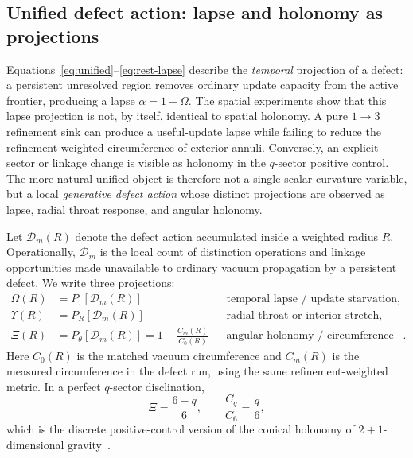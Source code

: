 
\subsection{Unified defect action: lapse and holonomy as projections}\label{sec:unified-defect-action}

Equations~\eqref{eq:unified}--\eqref{eq:rest-lapse} describe the
\emph{temporal} projection of a defect: a persistent unresolved region removes
ordinary update capacity from the active frontier, producing a lapse
$\alpha=1-\Omega$.  The spatial experiments show that this lapse projection is
not, by itself, identical to spatial holonomy.  A pure $1\to3$ refinement sink can
produce a useful-update lapse while failing to reduce the refinement-weighted
circumference of exterior annuli.  Conversely, an explicit sector or linkage
change is visible as holonomy in the $q$-sector positive control.  The more
natural unified object is therefore not a single scalar curvature variable, but
a local \emph{generative defect action} whose distinct projections are observed
as lapse, radial throat response, and angular holonomy.

Let $\mathcal{D}_m(R)$ denote the defect action accumulated inside a weighted
radius $R$.  Operationally, $\mathcal{D}_m$ is the local count of distinction
operations and linkage opportunities made unavailable to ordinary vacuum
propagation by a persistent defect.  We write three projections:
\begin{align}
  \Omega(R) &= P_\tau[\mathcal{D}_m(R)] && \text{temporal lapse / update starvation},\\
  \Upsilon(R) &= P_R[\mathcal{D}_m(R)] && \text{radial throat or interior stretch},\\
  \Xi(R) &= P_\theta[\mathcal{D}_m(R)]
     =1-\frac{C_m(R)}{C_0(R)} && \text{angular holonomy / circumference pinch}.
\end{align}
Here $C_0(R)$ is the matched vacuum circumference and $C_m(R)$ is the measured
circumference in the defect run, using the same refinement-weighted metric.  In
a perfect $q$-sector disclination,
\begin{equation}
  \Xi = \frac{6-q}{6},
  \qquad
  \frac{C_q}{C_6}=\frac{q}{6},
\end{equation}
which is the discrete positive-control version of the conical holonomy of
$2+1$-dimensional gravity~\cite{DeserJackiwTHooft1984}.

